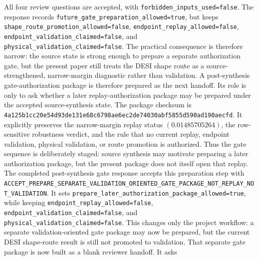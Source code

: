 \documentclass[11pt]{article}
\begin{document}
All four review questions are accepted, with
\texttt{forbidden\_\allowbreak{}inputs\_\allowbreak{}used=\allowbreak{}false}.  The response records
\texttt{future\_\allowbreak{}gate\_\allowbreak{}preparation\_\allowbreak{}allowed=\allowbreak{}true}, but keeps
\texttt{shape\_\allowbreak{}route\_\allowbreak{}promotion\_\allowbreak{}allowed=\allowbreak{}false},
\texttt{endpoint\_\allowbreak{}replay\_\allowbreak{}allowed=\allowbreak{}false},
\texttt{endpoint\_\allowbreak{}validation\_\allowbreak{}claimed=\allowbreak{}false}, and
\texttt{physical\_\allowbreak{}validation\_\allowbreak{}claimed=\allowbreak{}false}.  The practical consequence is
therefore narrow: the source state is strong enough to prepare a separate
authorization gate, but the present paper still treats the DESI shape route as
a source-strengthened, narrow-margin diagnostic rather than validation.
A post-synthesis gate-authorization package is therefore prepared as the next
handoff.  Its role is only to ask whether a later replay-authorization package
may be prepared under the accepted source-synthesis state.  The package checksum
is
\texttt{4a125b1c\allowbreak{}c20e54d9\allowbreak{}3de131e6\allowbreak{}8c6798ae\allowbreak{}6ec2de74\allowbreak{}030abf58\allowbreak{}55d590ad\allowbreak{}190aecfd}.
It explicitly preserves the narrow-margin replay status
\((0.01485705264)\), the row-sensitive robustness verdict, and the rule that no
current replay, endpoint validation, physical validation, or route promotion is
authorized.  Thus the gate sequence is deliberately staged: source synthesis
may motivate preparing a later authorization package, but the present package
does not itself open that replay.
The completed post-synthesis gate response accepts this preparation step with
\texttt{ACCEPT\_\allowbreak{}PREPARE\_\allowbreak{}SEPARATE\_\allowbreak{}VALIDATION\_\allowbreak{}ORIENTED\_\allowbreak{}GATE\_\allowbreak{}PACKAGE\_\allowbreak{}NOT\_\allowbreak{}REPLAY\_\allowbreak{}NOT\_\allowbreak{}VALIDATION}.
It sets \texttt{prepare\_\allowbreak{}later\_\allowbreak{}authorization\_\allowbreak{}package\_\allowbreak{}allowed=\allowbreak{}true}, while
keeping \texttt{endpoint\_\allowbreak{}replay\_\allowbreak{}allowed=\allowbreak{}false},
\texttt{endpoint\_\allowbreak{}validation\_\allowbreak{}claimed=\allowbreak{}false}, and
\texttt{physical\_\allowbreak{}validation\_\allowbreak{}claimed=\allowbreak{}false}.  This changes only the project
workflow: a separate validation-oriented gate package may now be prepared, but
the current DESI shape-route result is still not promoted to validation.
That separate gate package is now built as a blank reviewer handoff.  It asks
\end{document}
